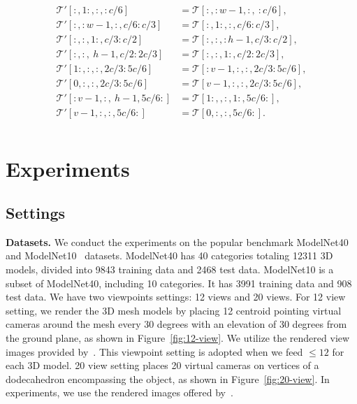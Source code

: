 \documentclass[11pt]{article}
\begin{document}
\begin{align}
\label{rreq}
\begin{split}
     \bm{\mathcal{T'}}[:,1\!:,:,:\!c/6] &= \bm{\mathcal{T}}[:,:\!w\!-\!1,:,\ :\!c/6], \\
     \bm{\mathcal{T'}}[:,:\!w\!-\!1,:,c/6\!:\!c/3] &= \bm{\mathcal{T}}[:,1\!:,:,c/6\!:\!c/3], \\
     \bm{\mathcal{T'}}[:,:,\!1\!:,c/3\!:\!c/2] &= \bm{\mathcal{T}}[:,:,:\!h\!-\!1,\!c/3\!:\!c/2], \\
     \bm{\mathcal{T'}}[:,:,\:\!h\!-\!1,c/2\!:\!2c/3] &= \bm{\mathcal{T}}[:,:,1\!:,c/2\!:\!2c/3], \\
     \bm{\mathcal{T'}}[1\!:,:,:,2c/3\!:\!5c/6] &= \bm{\mathcal{T}}[:\!v\!-\!1,:,:,\!2c/3\!:\!5c/6], \\
     \bm{\mathcal{T'}}[0,:,:,2c/3\!:\!5c/6] &= \bm{\mathcal{T}}[v\!-\!1,:,:,\!2c/3\!:\!5c/6], \\
     \bm{\mathcal{T'}}[:\!v\!-\!1,:,\:\!h\!-\!1,5c/6\!:] &= \bm{\mathcal{T}}[1\!:,,:,1\!:,5c/6\!:],\\
     \bm{\mathcal{T'}}[v\!-\!1,:,:,5c/6\!:] &= \bm{\mathcal{T}}[0,:,:,5c/6\!:].\\
\end{split}
\end{align}


\section{Experiments}

\subsection{Settings}
\noindent\textbf{Datasets.}
We conduct the experiments on the popular benchmark ModelNet40~\citep{chang2015shapenet} and ModelNet10~\citep{chang2015shapenet} datasets. ModelNet40 has 40 categories totaling 12311 3D models, divided into 9843 training data and 2468 test data. ModelNet10 is a subset of ModelNet40, including 10 categories. It has 3991 training data and 908 test data. We have two viewpoints settings: 12 views and 20 views. For 12 view setting, we render the 3D mesh models by placing 12 centroid pointing virtual cameras around the mesh every 30 degrees with an elevation of 30 degrees from the ground plane, as shown in Figure~\ref{fig:12-view}. We utilize the rendered view images provided by~\citet{wang2017dominant}. This viewpoint setting is adopted when we feed $\leq 12$ for each 3D model. 20 view setting places 20 virtual cameras on vertices of a dodecahedron encompassing the object, as shown in Figure~\ref{fig:20-view}. In experiments, we use the rendered images offered by~\citet{kanezaki2018rotationnet}.
\end{document}
